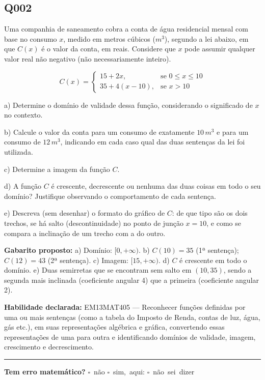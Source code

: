 \documentclass[11pt,a4paper]{article}
\begin{document}
\begin{samepage}
\subsection*{Q002}
Uma companhia de saneamento cobra a conta de água residencial mensal com base no consumo $x$, medido em metros cúbicos ($m^3$), segundo a lei abaixo, em que $C(x)$ é o valor da conta, em reais. Considere que $x$ pode assumir qualquer valor real não negativo (não necessariamente inteiro).

$$C(x) = \begin{cases} 15 + 2x, & \text{se } 0 \le x \le 10 \\ 35 + 4(x-10), & \text{se } x > 10 \end{cases}$$

a) Determine o domínio de validade dessa função, considerando o significado de $x$ no contexto.

b) Calcule o valor da conta para um consumo de exatamente $10\,m^3$ e para um consumo de $12\,m^3$, indicando em cada caso qual das duas sentenças da lei foi utilizada.

c) Determine a imagem da função $C$.

d) A função $C$ é crescente, decrescente ou nenhuma das duas coisas em todo o seu domínio? Justifique observando o comportamento de cada sentença.

e) Descreva (sem desenhar) o formato do gráfico de $C$: de que tipo são os dois trechos, se há salto (descontinuidade) no ponto de junção $x=10$, e como se compara a inclinação de um trecho com a do outro.

\textbf{Gabarito proposto:} a) Domínio: $[0,+\infty)$. b) $C(10)=35$ (1ª sentença); $C(12)=43$ (2ª sentença). c) Imagem: $[15,+\infty)$. d) $C$ é crescente em todo o domínio. e) Duas semirretas que se encontram sem salto em $(10,35)$, sendo a segunda mais inclinada (coeficiente angular 4) que a primeira (coeficiente angular 2).

\textbf{Habilidade declarada:} EM13MAT405 --- Reconhecer funções definidas por uma ou mais sentenças (como a tabela do Imposto de Renda, contas de luz, água, gás etc.), em suas representações algébrica e gráfica, convertendo essas representações de uma para outra e identificando domínios de validade, imagem, crescimento e decrescimento.
\end{samepage}

\noindent\rule{\linewidth}{0.4pt}
\textbf{Tem erro matemático?}\quad
\mbox{$\square$~não} \quad \mbox{$\square$~sim, aqui:} \underline{\hspace{5cm}}
\quad \mbox{$\square$~não sei dizer}
\end{document}
